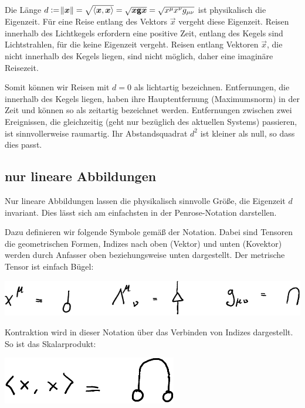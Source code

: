 Die Länge $d := \norm{\boldsymbol{x}} = \sqrt{\left\langle \boldsymbol{x}, \boldsymbol{x} \right\rangle} = \sqrt{\boldsymbol{x}
\boldsymbol{\mathsf{g}} \boldsymbol{x}} = \sqrt{x^\mu x^\nu g_{\mu \nu}}$ ist physikalisch die
Eigenzeit. Für eine Reise entlang des Vektors $\vec x$ vergeht diese Eigenzeit.
Reisen innerhalb des Lichtkegels erfordern eine positive Zeit, entlang des
Kegels sind Lichtstrahlen, für die keine Eigenzeit vergeht. Reisen entlang
Vektoren $\vec x$, die nicht innerhalb des Kegels liegen, sind nicht möglich,
daher eine imaginäre Reisezeit.

Somit können wir Reisen mit $d = 0$ als lichtartig bezeichnen. Entfernungen,
die innerhalb des Kegels liegen, haben ihre Hauptentfernung (Maximumsnorm) in
der Zeit und können so als zeitartig bezeichnet werden. Entfernungen zwischen
zwei Ereignissen, die gleichzeitig (geht nur bezüglich des aktuellen Systems)
passieren, ist sinnvollerweise raumartig. Ihr Abstandsquadrat $d^2$ ist kleiner
als null, so dass dies passt.

\subsection{nur lineare Abbildungen}

Nur lineare Abbildungen lassen die physikalisch sinnvolle Größe, die Eigenzeit
$d$ invariant. Dies lässt sich am einfachsten in der Penrose-Notation
darstellen.

Dazu definieren wir folgende Symbole gemäß der Notation. Dabei sind Tensoren
die geometrischen Formen, Indizes nach oben (Vektor) und unten (Kovektor)
werden durch Anfasser oben beziehungsweise unten dargestellt. Der metrische
Tensor ist einfach Bügel:
\begin{center}
	\includegraphics{H1-Definitionen.pdf}
\end{center}

Kontraktion wird in dieser Notation über das Verbinden von Indizes dargestellt.
So ist das Skalarprodukt:
\begin{center}
	\includegraphics{H1-Skalarprodukt.pdf}
\end{center}

